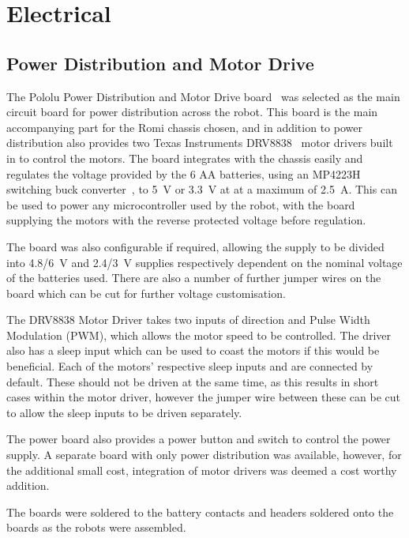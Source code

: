 
\chapter{Electrical}\label{electrical}

\section{Power Distribution and Motor Drive}\label{elec/poweranddrive}
The Pololu Power Distribution and Motor Drive board~\cite{pololupower}
was selected as the main circuit board for power distribution across
the robot. This board is the main accompanying part for the Romi
chassis chosen, and in addition to power distribution also provides
two Texas Instruments DRV8838~\cite{texasdrivers} motor drivers built
in to control the motors. The board integrates with the chassis easily
and regulates the voltage provided by the 6 AA batteries, using an
MP4223H switching buck converter~\cite{mpbuck}, to \SI{5}{\volt} or
\SI{3.3}{\volt} at at a maximum of \SI{2.5}{\ampere}. This can be used
to power any microcontroller used by the robot, with the board
supplying the motors with the reverse protected voltage before
regulation.

The board was also configurable if required, allowing the supply to be
divided into \SI{4.8/6}{\volt} and \SI{2.4/3}{\volt} supplies
respectively dependent on the nominal voltage of the batteries used.
There are also a number of further jumper wires on the board which can
be cut for further voltage customisation.

The DRV8838 Motor Driver takes two inputs of direction and Pulse Width
Modulation (PWM), which allows the motor speed to be controlled. The
driver also has a sleep input which can be used to coast the motors if
this would be beneficial. Each of the motors' respective sleep inputs
and are connected by default. These should not be driven at the same
time, as this results in short cases within the motor driver, however
the jumper wire between these can be cut to allow the sleep inputs to
be driven separately.

The power board also provides a power button and switch to control the
power supply. A separate board with only power distribution was
available, however, for the additional small cost, integration of
motor drivers was deemed a cost worthy addition.

The boards were soldered to the battery contacts and headers soldered
onto the boards as the robots were assembled.

